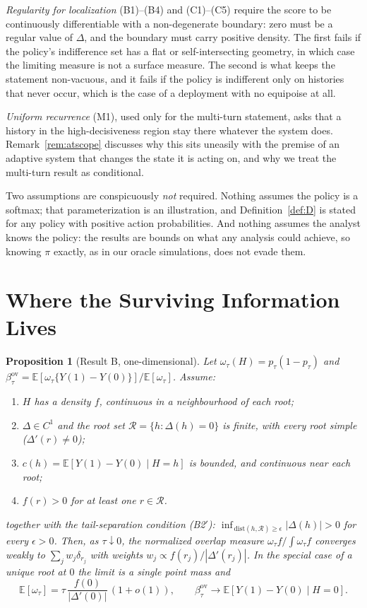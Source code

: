 \documentclass[11pt]{article}
\newtheorem{proposition}{Proposition}
\theoremstyle{definition}
\theoremstyle{remark}
\newcommand{\E}{\mathbb{E}}
\newcommand{\ov}{\mathrm{ov}}
\begin{document}
\emph{Regularity for localization} (B1)--(B4) and (C1)--(C5) require the
score to be continuously differentiable with a non-degenerate boundary: zero
must be a regular value of $\Delta$, and the boundary must carry positive
density. The first fails if the policy's indifference set has a flat or
self-intersecting geometry, in which case the limiting measure is not a
surface measure. The second is what keeps the statement non-vacuous, and it
fails if the policy is indifferent only on histories that never occur, which
is the case of a deployment with no equipoise at all.

\emph{Uniform recurrence} (M1), used only for the multi-turn statement,
asks that a history in the high-decisiveness region stay there whatever the
system does. Remark~\ref{rem:atscope} discusses why this sits uneasily with
the premise of an adaptive system that changes the state it is acting on,
and why we treat the multi-turn result as conditional.

Two assumptions are conspicuously \emph{not} required. Nothing assumes the
policy is a softmax; that parameterization is an illustration, and
Definition~\ref{def:D} is stated for any policy with positive action
probabilities. And nothing assumes the analyst knows the policy: the results
are bounds on what any analysis could achieve, so knowing $\pi$ exactly, as
in our oracle simulations, does not evade them.

\section{Where the Surviving Information Lives}\label{sec:resultB}

\begin{proposition}[Result B, one-dimensional]\label{prop:b}
Let $\omega_\tau(H) = p_\tau(1-p_\tau)$ and $\beta^{\ov}_\tau =
\E[\omega_\tau\{Y(1)-Y(0)\}]/\E[\omega_\tau]$. Assume:
\begin{enumerate}[label=(B\arabic*),leftmargin=3.2em,itemsep=1pt]
\item $H$ has a density $f$, continuous in a neighbourhood of each root;
\item $\Delta \in C^1$ and the root set $\mathcal{R} = \{h : \Delta(h) = 0\}$
      is \emph{finite}, with every root simple ($\Delta'(r) \neq 0$);
\item $c(h) = \E[Y(1)-Y(0) \mid H = h]$ is bounded, and continuous near
      each root;
\item $f(r) > 0$ for at least one $r \in \mathcal{R}$.
\end{enumerate}
together with the tail-separation condition (B2$'$):
$\inf_{\,\mathrm{dist}(h,\mathcal{R}) \geq \epsilon} |\Delta(h)| > 0$ for
every $\epsilon > 0$. Then, as $\tau \downarrow 0$, the normalized overlap
measure $\omega_\tau f / \int \omega_\tau f$ converges weakly to
$\sum_j w_j \delta_{r_j}$ with weights $w_j \propto f(r_j)/|\Delta'(r_j)|$.
In the special case of a \emph{unique} root at $0$ the limit is a single
point mass and
\[
\E[\omega_\tau] = \tau\,\frac{f(0)}{|\Delta'(0)|}\,(1+o(1)),
\qquad
\beta^{\ov}_\tau \to \E[Y(1)-Y(0) \mid H = 0].
\]
\end{proposition}
\end{document}
